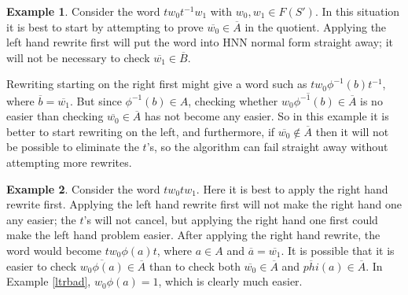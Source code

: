 \documentclass[11pt]{article} %
\theoremstyle{definition}
\theoremstyle{definition}
\theoremstyle{definition}
\theoremstyle{definition}
\theoremstyle{definition}
\theoremstyle{definition}
\newtheorem{exmpl}{Example}[theorem]
\begin{document}
\begin{exmpl}\label{rtlbad}
Consider the word $tw_0t^{-1}w_1$ with $w_0, w_1 \in F(S')$. In this situation
it is best to start by attempting to prove $\overline{w_0} \in \overline{A}$ in the quotient.
Applying the left hand rewrite first will put the word into HNN normal form
straight away; it will not be necessary to check $\overline{w_1} \in \overline{B}$.

Rewriting starting on the right first might give a word such as
$tw_0 \phi^{-1}(b)t^{-1}$, where $\overline{b} = \overline{w_1}$. But since
$\phi^{-1}(b) \in A$, checking whether $\overline{w_0\phi^{-1}(b)} \in \overline{A}$ is
no easier than checking $\overline{w_0} \in \overline{A}$ has not become
any easier. So in this example it is better to start rewriting on the left, and furthermore,
if $\overline{w_0} \notin \overline{A}$ then it will not be possible to eliminate the $t$'s, so the
algorithm can fail straight away without attempting more rewrites.



\end{exmpl}

\begin{exmpl}\label{ltrbad2}
  Consider the word $tw_0tw_1$. Here it is best to apply the right hand rewrite first.
  Applying the left hand rewrite first will not make the right hand one any easier; the $t$'s will
  not cancel, but applying the right hand one first could make the left hand problem easier.
  After applying the right hand rewrite, the word would become $tw_0\phi(a)t$, where $a \in A$
  and $\overline{a} = \overline{w_1}$. It is possible that it is easier to check $\overline{w_0\phi(a)} \in \overline{A}$
  than to check both $\overline{w_0} \in \overline{A}$ and $\overline{phi}(a) \in \overline{A}$. In Example
  \ref{ltrbad}, $w_0\phi(a) = 1$, which is clearly much easier.
\end{exmpl}
\end{document}
